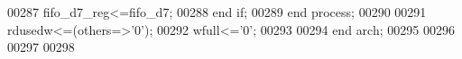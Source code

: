 \begin{DoxyCode}
00287           \textcolor{vhdlchar}{fifo_d7_reg}\textcolor{vhdlchar}{<=}\textcolor{vhdlchar}{fifo_d7};
00288         \textcolor{keywordflow}{end} \textcolor{keywordflow}{if};
00289     \textcolor{keywordflow}{end} \textcolor{keywordflow}{process};
00290      
00291      \textcolor{vhdlchar}{rdusedw}\textcolor{vhdlchar}{<=}\textcolor{vhdlchar}{(}\textcolor{keywordflow}{others}\textcolor{vhdlchar}{=}\textcolor{vhdlchar}{>}\textcolor{vhdlchar}{'}\textcolor{vhdllogic}{}\textcolor{vhdllogic}{0}\textcolor{vhdlchar}{'}\textcolor{vhdlchar}{)};
00292      \textcolor{vhdlchar}{wfull}\textcolor{vhdlchar}{<=}\textcolor{vhdlchar}{'}\textcolor{vhdllogic}{}\textcolor{vhdllogic}{0}\textcolor{vhdlchar}{'};
00293   
00294 \textcolor{keywordflow}{end} \textcolor{vhdlchar}{arch};   
00295 
00296 
00297 
00298 
\end{DoxyCode}
